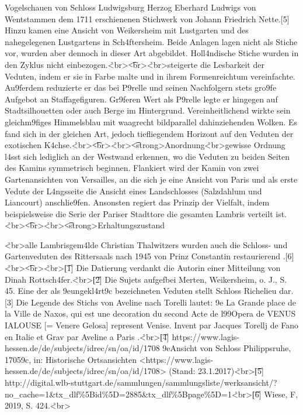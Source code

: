 \documentclass[
  a4paper,
]{book}
\begin{document}
Vogelschauen von Schloss Ludwigsburg Herzog Eberhard Ludwigs von
W\xbcrttemberg entstammen dem 1711 erschienenen Stichwerk von Johann
Friedrich Nette.{[}5{]} Hinzu kamen eine Ansicht von Weikersheim mit
Lustgarten und des nahegelegenen Lustgartens in Sch\xa4ftersheim.
Beide Anlagen lagen nicht als Stiche vor, wurden aber dennoch in dieser
Art abgebildet. Holl\xa4ndische Stiche wurden in den Zyklus nicht
einbezogen.\r<br\textgreater{}\t<br\textgreater{}\r<br\textgreater{}\tThalwitzer steigerte
die Lesbarkeit der Veduten, indem er sie in Farbe malte und in ihrem
Formenreichtum vereinfachte. Au\x9ferdem reduzierte er das bei
P\xa9relle und seinen Nachfolgern stets gro\x9fe Aufgebot an
Staffagefiguren. Gr\x9feren Wert als P\xa9relle legte er
hingegen auf Stadtsilhouetten oder auch Berge im Hintergrund.
Vereinheitlichend wirkte sein gleichm\x9figes Himmelsblau
mit waagrecht bildparallel dahinziehenden Wolken. Es fand sich in der
gleichen Art, jedoch \xbcber tiefliegendem Horizont auf den Veduten
der exotischen
K\xbcbelgew{}\xa4chse.\r<br\textgreater{}\t<br\textgreater{}\r<br\textgreater{}\t<strong\textgreater Anordnung\r<br\textgreater{}\tEine gewisse
Ordnung l\xa4sst sich lediglich an der Westwand erkennen, wo die
Veduten zu beiden Seiten des Kamins symmetrisch beginnen. Flankiert wird
der Kamin von zwei Gartenansichten von Versailles, an die sich je eine
Ansicht von Paris und als erste Vedute der L\xa4ngsseite die Ansicht
eines Landschlosses (Salzdahlum und Liancourt) anschlie\x9fen.
Ansonsten regiert das Prinzip der Vielfalt, indem beispielsweise die
Serie der Pariser Stadttore \xbcber die gesamten Lambris verteilt
ist.\r<br\textgreater{}\t<br\textgreater{}\r<br\textgreater{}\t<h6><strong\textgreater Erhaltungszustand

\r<br\textgreater{}\tWie alle Lambrisgem\xa4lde Christian
Thalwitzers wurden auch die Schloss- und Gartenveduten des Rittersaals
nach 1945 von Prinz Constantin restaurierend
\xbcbermalt.{[}6{]}\r<br\textgreater{}\t<br\textgreater{}\r<br\textgreater{}\t[1{]}
Die Datierung verdankt die Autorin einer Mitteilung von Dinah
Rottsch\xa4fer.\r<br\textgreater{}\t[2{]} Die Sujets
aufgef\xbchrt bei Merten, Weikersheim, o. J., S. 45.
Eine der als \x9eungekl\xa4rt\x9c bezeichneten
Veduten stellt Schloss Richelieu dar.{[}3{]} Die Legende des Stichs von
Aveline nach Torelli lautet: \x9e La Grande place de la Ville de
Naxos, qui est une decoration du second Acte de l\x99Opera de
VENUS IALOUSE {[}= Venere Gelosa{]} represent  Venise.
Invent par Jacques Torellj de Fano en Italie et Grav par
Aveline a Paris \xbb.\r<br\textgreater{}\t[4{]}
https://www.lagis-hessen.de/de/subjects/idrec/sn/oa/id/1708
\x9eAnsicht von Schloss Philippsruhe, 1705\x9c, in:
Historische Ortsansichten
\textless https://www.lagis-hessen.de/de/subjects/idrec/sn/oa/id/1708\textgreater{}
(Stand: 23.1.2017)\r<br\textgreater{}\t[5{]}
http://digital.wlb-stuttgart.de/sammlungen/sammlungsliste/werksansicht/?no\_cache=1\&tx\_dlf\%5Bid\%5D=2885\&tx\_dlf\%5Bpage\%5D=1\r<br\textgreater{}\t[6{]}
Wiese, F\xbcrstensitz, 2019, S. 424.\r<br\textgreater{}
\end{document}
